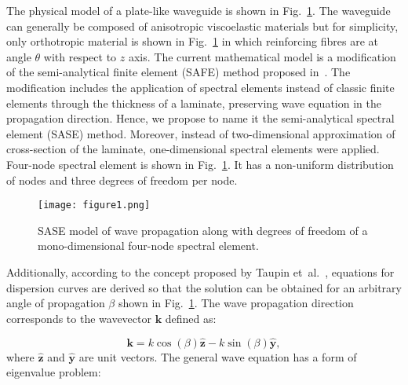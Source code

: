 \documentclass[preprint,12pt]{elsarticle}
\newcommand{\vect}[1]{\mathbf{#1}} %
\begin{document}
The physical model of a plate-like waveguide is shown in Fig.~\ref{fig:layered_composite_SASE}.  
The waveguide can generally be composed of anisotropic viscoelastic materials but for simplicity, only orthotropic material is shown in Fig.~\ref{fig:layered_composite_SASE} in which reinforcing fibres are at angle \(\theta\) with respect to \(z\) axis. 
The current mathematical model is a modification of the semi-analytical finite element (SAFE) method proposed in~\cite{Bartoli2006}. 
The modification includes the application of spectral elements instead of classic finite elements through the thickness of a laminate, preserving wave equation in the propagation direction. 
Hence, we propose to name it the semi-analytical spectral element (SASE) method. Moreover, instead of two-dimensional approximation of cross-section of the laminate, one-dimensional spectral elements were applied. Four-node spectral element is shown in Fig.~\ref{fig:layered_composite_SASE}. It has a non-uniform distribution of nodes and three degrees of freedom per node.
	
		\begin{figure} [h!]
		\centering
		\texttt{[image: figure1.png]}
		\caption{SASE model of wave propagation along with degrees of freedom of a mono-dimensional four-node spectral element.}
		\label{fig:layered_composite_SASE}
	\end{figure}
	
Additionally, according to the concept proposed by Taupin et~al.~\cite{Taupin2011}, equations for dispersion curves are derived so that the solution can be obtained for 
an arbitrary angle of propagation \(\beta\) shown in Fig.~\ref{fig:layered_composite_SASE}. 
The wave propagation direction corresponds to the wavevector \(\vect{k}\) defined as:
	
	\begin{equation}
	  \vect{k} = k \cos (\beta)\hat{ \vect{z}} - k \sin (\beta) \hat{\vect{y}},
		\label{eq:wavevector}
	\end{equation}
where \(\hat{ \vect{z}}\) and \(\hat{\vect{y}}\) are unit vectors. 
The general wave equation has a form of eigenvalue problem:
\end{document}
